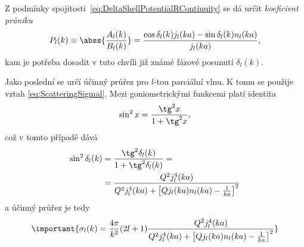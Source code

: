 \begin{solution}
		Z podmínky spojitosti~\eqref{eq:DeltaShellPotentialRContinuity} se dá určit \emph{koeficient průniku}
		\begin{equation}\label{eq:DeltaShellPotentialP}
			P_{l}(k)
				\equiv\abss{\frac{A_{l}(k)}{B_{l}(k)}}
				=\frac{\cos{\delta_{l}(k)}j_{l}(ka)-\sin{\delta_{l}(k)}n_{l}(ka)}{j_{l}(ka)},
		\end{equation}
		kam je potřeba dosadit v tuto chvíli již známé fázové posunutí $\delta_{l}(k)$.

		Jako poslední se určí účinný průřez pro $l$-tou parciální vlnu.
		K tomu se použije vztah \eqref{eq:ScatteringSigmal}.
		Mezi goniometrickými funkcemi platí identita
		\begin{equation}
			\sin^{2}x=\frac{\tg^{2}x}{1+\tg^{2}x},
		\end{equation}
		což v tomto případě dává
		\begin{align}
			\sin^{2}\delta_{l}(k)
				&=\frac{\tg^{2}\delta_{l}(k)}{1+\tg^{2}\delta_{l}(k)}=\nonumber\\
				&=\frac{Q^{2}j_{l}^{4}(ka)}{Q^{2}j_{l}^{4}(ka)+\left[Qj_l(ka)n_{l}(ka)-\frac{1}{ka}\right]^{2}}
		\end{align}
		a účinný průřez je tedy
		\begin{equation}\label{eq:DeltaShellPotentialCrossSection}
			\important{
				\sigma_{l}(k)
					=\frac{4\pi}{k^{2}}(2l+1)
						\frac{Q^{2}j_{l}^{4}(ka)}{Q^{2}j_{l}^{4}(ka)+\left[Qj_l(ka)n_{l}(ka)-\frac{1}{ka}\right]^{2}}
			}
		\end{equation}


\end{solution}
